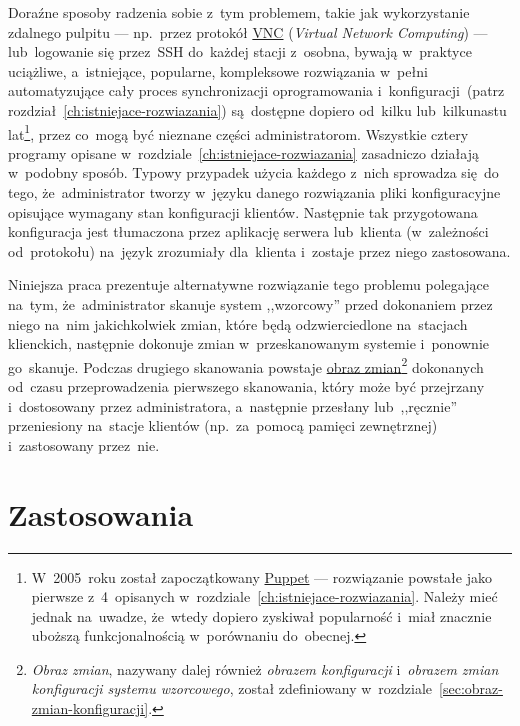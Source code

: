 \documentclass[thesis]{subfiles}
\begin{document}
Doraźne sposoby radzenia sobie z~tym problemem, takie jak wykorzystanie zdalnego pulpitu --- np.~przez protokół \href{https://en.wikipedia.org/wiki/Virtual_Network_Computing}{VNC} (\emph{Virtual Network Computing}) --- lub~logowanie się przez~SSH do~każdej stacji z~osobna, bywają w~praktyce uciążliwe, a~istniejące, popularne, kompleksowe rozwiązania w~pełni automatyzujące cały proces synchronizacji oprogramowania i~konfiguracji~(patrz rozdział~\ref{ch:istniejace-rozwiazania}) są~dostępne dopiero od~kilku lub~kilkunastu lat\footnote{W~2005~roku został zapoczątkowany \hyperref[sec:puppet]{Puppet} --- rozwiązanie powstałe jako pierwsze z~4~opisanych w~rozdziale~\ref{ch:istniejace-rozwiazania}. Należy mieć jednak na~uwadze, że~wtedy dopiero zyskiwał popularność i~miał znacznie uboższą funkcjonalnością w~porównaniu do~obecnej.}, przez co~mogą być nieznane części administratorom. Wszystkie cztery programy opisane w~rozdziale~\ref{ch:istniejace-rozwiazania} zasadniczo działają w~podobny sposób. Typowy przypadek użycia każdego z~nich sprowadza się~do tego, że~administrator tworzy w~języku danego rozwiązania pliki konfiguracyjne opisujące wymagany stan konfiguracji klientów. Następnie tak przygotowana konfiguracja jest tłumaczona przez aplikację serwera lub~klienta (w~zależności od~protokołu) na~język zrozumiały dla~klienta i~zostaje przez niego zastosowana.

Niniejsza praca prezentuje alternatywne rozwiązanie tego problemu polegające na~tym, że~administrator skanuje system ,,wzorcowy'' przed dokonaniem przez niego na~nim jakichkolwiek zmian, które będą odzwierciedlone na~stacjach klienckich, następnie dokonuje zmian w~przeskanowanym systemie i~ponownie go~skanuje. Podczas drugiego skanowania powstaje \hyperref[sec:obraz-zmian-konfiguracji]{obraz zmian}\footnote{\emph{Obraz zmian}, nazywany dalej również \emph{obrazem konfiguracji} i~\emph{obrazem zmian konfiguracji systemu wzorcowego}, został zdefiniowany w~rozdziale~\ref{sec:obraz-zmian-konfiguracji}.} dokonanych od~czasu przeprowadzenia pierwszego skanowania, który może być przejrzany i~dostosowany przez administratora, a~następnie przesłany lub~,,ręcznie'' przeniesiony na~stacje klientów (np.~za~pomocą pamięci zewnętrznej) i~zastosowany przez~nie.


\section{Zastosowania}
\end{document}
